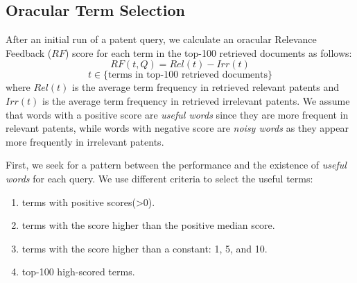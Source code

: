 \subsection{Oracular Term Selection}
After an initial run of a patent query, we
calculate an oracular Relevance Feedback ($\mathit{RF}$) score for each term in the top-100
retrieved documents as follows:
\begin{equation}
RF(t,Q)=Rel(t)-Irr(t) 
 \label{eq:score}
\end{equation}
\begin{displaymath}t\in \lbrace \mbox{terms in top-100 retrieved documents}\rbrace\end{displaymath}
where $ \mathit{Rel(t)} $ is the average term frequency in retrieved relevant patents and $ \mathit{Irr(t)} $ is the average term frequency in retrieved irrelevant patents. We assume that words with a positive score are \emph{useful words} since they are more frequent in relevant patents, while words with negative score are \emph{noisy words} as they appear more frequently in irrelevant patents. 

First, we seek for a pattern between the performance and the existence of \textit{useful words} for each query. We use different criteria to select the useful terms:
\begin{enumerate}
\item terms with positive scores(>0).
\item terms with the score higher than the positive median score.
\item terms with the score higher than a constant: 1, 5, and 10.
\item top-100 high-scored terms.
\end{enumerate}

